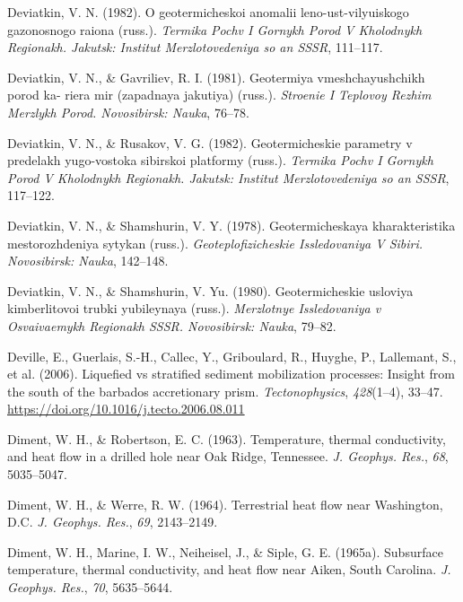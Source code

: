\begin{CSLReferences}{1}{1}
\leavevmode{}%
Deviatkin, V. N. (1982). O geotermicheskoi anomalii leno-ust-vilyuiskogo gazonosnogo raiona (russ.). \emph{Termika Pochv I Gornykh Porod V Kholodnykh Regionakh. Jakutsk: Institut Merzlotovedeniya so an SSSR}, 111--117.

\leavevmode{}%
Deviatkin, V. N., \& Gavriliev, R. I. (1981). Geotermiya vmeshchayushchikh porod ka- riera mir (zapadnaya jakutiya) (russ.). \emph{Stroenie I Teplovoy Rezhim Merzlykh Porod. Novosibirsk: Nauka}, 76--78.

\leavevmode{}%
Deviatkin, V. N., \& Rusakov, V. G. (1982). Geotermicheskie parametry v predelakh yugo-vostoka sibirskoi platformy (russ.). \emph{Termika Pochv I Gornykh Porod V Kholodnykh Regionakh. Jakutsk: Institut Merzlotovedeniya so an SSSR}, 117--122.

\leavevmode{}%
Deviatkin, V. N., \& Shamshurin, V. Y. (1978). Geotermicheskaya kharakteristika mestorozhdeniya sytykan (russ.). \emph{Geoteplofizicheskie Issledovaniya V Sibiri. Novosibirsk: Nauka}, 142--148.

\leavevmode{}%
Deviatkin, V. N., \& Shamshurin, V. Yu. (1980). Geotermicheskie usloviya kimberlitovoi trubki yubileynaya (russ.). \emph{Merzlotnye Issledovaniya v Osvaivaemykh Regionakh SSSR. Novosibirsk: Nauka}, 79--82.

\leavevmode{}%
Deville, E., Guerlais, S.-H., Callec, Y., Griboulard, R., Huyghe, P., Lallemant, S., et al. (2006). Liquefied vs stratified sediment mobilization processes: Insight from the south of the barbados accretionary prism. \emph{Tectonophysics}, \emph{428}(1--4), 33--47. \url{https://doi.org/10.1016/j.tecto.2006.08.011}

\leavevmode{}%
Diment, W. H., \& Robertson, E. C. (1963). Temperature, thermal conductivity, and heat flow in a drilled hole near {Oak Ridge, Tennessee}. \emph{J. Geophys. Res.}, \emph{68}, 5035--5047.

\leavevmode{}%
Diment, W. H., \& Werre, R. W. (1964). Terrestrial heat flow near {Washington, D.C.} \emph{J. Geophys. Res.}, \emph{69}, 2143--2149.

\leavevmode{}%
Diment, W. H., Marine, I. W., Neiheisel, J., \& Siple, G. E. (1965a). Subsurface temperature, thermal conductivity, and heat flow near {Aiken, South Carolina}. \emph{J. Geophys. Res.}, \emph{70}, 5635--5644.


\end{CSLReferences}
